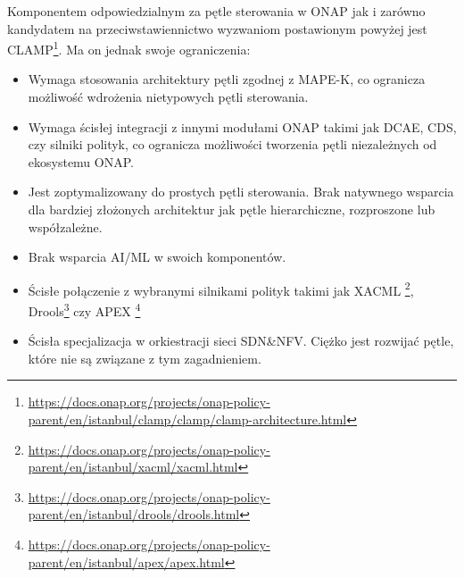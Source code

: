 Komponentem odpowiedzialnym za pętle sterowania w ONAP jak i zarówno kandydatem na przeciwstawiennictwo wyzwaniom postawionym powyżej jest CLAMP\footnote{\url{https://docs.onap.org/projects/onap-policy-parent/en/istanbul/clamp/clamp/clamp-architecture.html}}. Ma on jednak swoje ograniczenia:
\begin{itemize}
    \item Wymaga stosowania architektury pętli zgodnej z MAPE-K, co ogranicza możliwość wdrożenia nietypowych pętli sterowania.
    \item Wymaga ścisłej integracji z innymi modułami ONAP takimi jak DCAE, CDS, czy silniki polityk, co ogranicza możliwości tworzenia pętli niezależnych od ekosystemu ONAP.
    \item Jest zoptymalizowany do prostych pętli sterowania. Brak natywnego wsparcia dla bardziej złożonych architektur jak pętle hierarchiczne, rozproszone lub współzależne.
    \item Brak wsparcia AI/ML w swoich komponentów.
    \item Ścisłe połączenie z wybranymi silnikami polityk takimi jak XACML \footnote{\url{https://docs.onap.org/projects/onap-policy-parent/en/istanbul/xacml/xacml.html}}, Drools\footnote{\url{https://docs.onap.org/projects/onap-policy-parent/en/istanbul/drools/drools.html}} czy APEX \footnote{\url{https://docs.onap.org/projects/onap-policy-parent/en/istanbul/apex/apex.html}} 
    \item Ścisła specjalizacja w orkiestracji sieci SDN\&NFV. Ciężko jest rozwijać pętle, które nie są związane z tym zagadnieniem.
\end{itemize}





